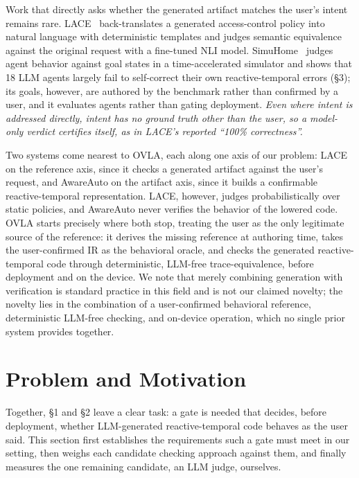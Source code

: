 \documentclass[sigconf,nonacm,anonymous,review]{acmart}
\begin{document}
Work that directly asks whether the generated artifact matches the user's intent remains rare. LACE~\cite{lace} back-translates a generated access-control policy into natural language with deterministic templates and judges semantic equivalence against the original request with a fine-tuned NLI model. SimuHome~\cite{simuhome} judges agent behavior against goal states in a time-accelerated simulator and shows that 18 LLM agents largely fail to self-correct their own reactive-temporal errors (\S3); its goals, however, are authored by the benchmark rather than confirmed by a user, and it evaluates agents rather than gating deployment. \emph{Even where intent is addressed directly, intent has no ground truth other than the user, so a model-only verdict certifies itself, as in LACE's reported ``100\% correctness''.}

Two systems come nearest to OVLA, each along one axis of our problem: LACE on the reference axis, since it checks a generated artifact against the user's request, and AwareAuto on the artifact axis, since it builds a confirmable reactive-temporal representation. LACE, however, judges probabilistically over static policies, and AwareAuto never verifies the behavior of the lowered code. OVLA starts precisely where both stop, treating the user as the only legitimate source of the reference: it derives the missing reference at authoring time, takes the user-confirmed IR as the behavioral oracle, and checks the generated reactive-temporal code through deterministic, LLM-free trace-equivalence, before deployment and on the device. We note that merely combining generation with verification is standard practice in this field and is not our claimed novelty; the novelty lies in the combination of a user-confirmed behavioral reference, deterministic LLM-free checking, and on-device operation, which no single prior system provides together.

\section{Problem and Motivation}

Together, \S1 and \S2 leave a clear task: a gate is needed that decides, before deployment, whether LLM-generated reactive-temporal code behaves as the user said. This section first establishes the requirements such a gate must meet in our setting, then weighs each candidate checking approach against them, and finally measures the one remaining candidate, an LLM judge, ourselves.
\end{document}
